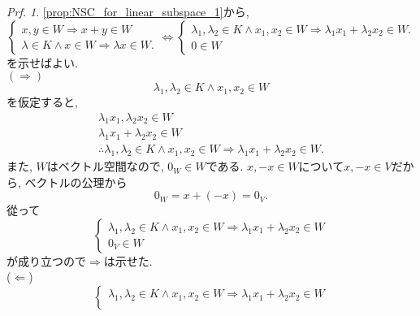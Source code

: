 \documentclass[a4paper,10pt,report]{amsart}
\theoremstyle{plain}
\theoremstyle{definition}
\theoremstyle{remark}
\newtheorem{prf}{Prf.}
\begin{document}
\begin{prf}
    \cref{prop:NSC_for_linear_subspace_1}から, 
    \begin{equation*}
        \begin{cases}
            x, y\in W\Rightarrow x+y\in W\\
            \lambda\in K\wedge x\in W\Rightarrow \lambda x\in W. 
        \end{cases}
        \Leftrightarrow
        \begin{cases}
            \lambda_{1},\lambda_{2}\in K\wedge x_{1},x_{2}\in W\Rightarrow \lambda_{1}x_{1}+\lambda_{2}x_{2}\in W. \\
            0\in W
        \end{cases}
    \end{equation*}
    を示せばよい. \\
    \((\Rightarrow)\)
    \begin{equation*}
        \lambda_{1},\lambda_{2}\in K\wedge x_{1},x_{2}\in W
    \end{equation*}
    を仮定すると, 
    \begin{align*}
        \lambda_{1}x_{1},\lambda_{2}x_{2}\in W\\
        \lambda_{1}x_{1}+\lambda_{2}x_{2}\in W\\
        \therefore \lambda_{1},\lambda_{2}\in K\wedge x_{1},x_{2}\in W\Rightarrow \lambda_{1}x_{1}+\lambda_{2}x_{2}\in W. 
    \end{align*}
    また, \(W\)はベクトル空間なので, \(0_{W}\in W\)である. \(x,-x\in W\)について\(x,-x\in V\)だから,
    ベクトルの公理から
    \begin{equation*}
        0_{W}=x+(-x)=0_{V}.
    \end{equation*}
    從って
    \begin{equation*}
        \begin{cases}
            \lambda_{1}, \lambda_{2}\in K\wedge x_{1}, x_{2}\in W\Rightarrow \lambda_{1}x_{1}+\lambda_{2}x_{2}\in W\\
            0_{V}\in W
        \end{cases}
    \end{equation*}
    が成り立つので\(\Rightarrow{}\)は示せた. \\
    (\(\Leftarrow{}\))
    \begin{equation*}
        \begin{cases}
            \lambda_{1}, \lambda_{2}\in K\wedge x_{1}, x_{2}\in W\Rightarrow \lambda_{1}x_{1}+\lambda_{2}x_{2}\in W\\

\end{cases}
\end{equation*}
\end{prf}
\end{document}
